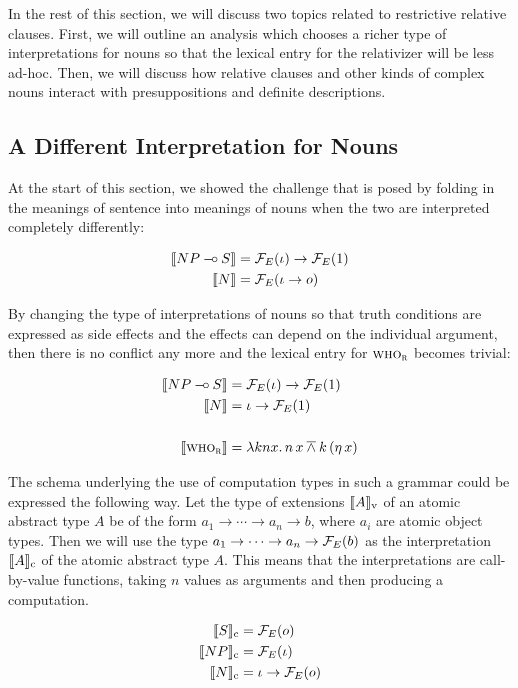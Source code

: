 In the rest of this section, we will discuss two topics related to
restrictive relative clauses. First, we will outline an analysis which
chooses a richer type of interpretations for nouns so that the lexical
entry for the relativizer will be less ad-hoc. Then, we will discuss how
relative clauses and other kinds of complex nouns interact with
presuppositions and definite descriptions.


\subsection{A Different Interpretation for Nouns}
\label{ssec:different-nouns}

At the start of this section, we showed the challenge that is posed by
folding in the meanings of sentence into meanings of nouns when the two are
interpreted completely differently:

\begin{align*}
  \llbracket NP \mathbin{{-}\mkern-3.5mu{\circ}} S \rrbracket &= \mathcal{F}_E(\iota) \to \mathcal{F}_E(1) \\
  \llbracket N \rrbracket &= \mathcal{F}_E(\iota \to o)
\end{align*}

By changing the type of interpretations of nouns so that truth conditions
are expressed as side effects and the effects can depend on the individual
argument, then there is no conflict any more and the lexical entry for
$\textsc{who}_{\textsc{r}}$ becomes trivial:

\begin{align*}
  \llbracket NP \mathbin{{-}\mkern-3.5mu{\circ}} S \rrbracket &= \mathcal{F}_E(\iota) \to \mathcal{F}_E(1) \\
  \llbracket N \rrbracket &= \iota \to \mathcal{F}_E(1) \\
  \\
  \llbracket \textsc{who}_{\textsc{r}} \rrbracket &= \lambda k n x.\, n\,x \mathbin{\overline{\land}} k\,(\eta\,x)
\end{align*}

The schema underlying the use of computation types in such a grammar could
be expressed the following way. Let the type of extensions
$\llbracket A \rrbracket_{\mathrm{v}}$ of an atomic abstract type $A$ be of the form
$a_1 \to \cdots \to a_n \to b$, where $a_i$ are atomic object types. Then
we will use the type $a_1 \to \cdots \to a_n \to \mathcal{F}_E(b)$ as the
interpretation $\llbracket A \rrbracket_{\mathrm{c}}$ of the atomic abstract type $A$. This
means that the interpretations are call-by-value functions, taking $n$
values as arguments and then producing a computation.

\begin{align*}
  \llbracket S \rrbracket_{\mathrm{c}} &= \mathcal{F}_E(o) \\
  \llbracket NP \rrbracket_{\mathrm{c}} &= \mathcal{F}_E(\iota) \\
  \llbracket N \rrbracket_{\mathrm{c}} &= \iota \to \mathcal{F}_E(o)
\end{align*}

